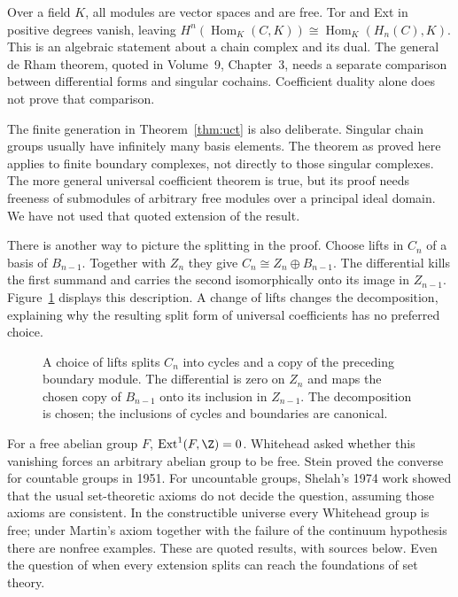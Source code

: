 Over a field $K$, all modules are vector spaces and are free. Tor and Ext in positive degrees vanish, leaving
$H^n(\operatorname{Hom}_K(C,K))\cong\operatorname{Hom}_K(H_n(C),K)$.
This is an algebraic statement about a chain complex and its dual. The general de Rham theorem, quoted in Volume~9, Chapter~3, needs a separate comparison between differential forms and singular cochains. Coefficient duality alone does not prove that comparison.

The finite generation in Theorem~\ref{thm:uct} is also deliberate. Singular chain groups usually have infinitely many basis elements. The theorem as proved here applies to finite boundary complexes, not directly to those singular complexes. The more general universal coefficient theorem is true, but its proof needs freeness of submodules of arbitrary free modules over a principal ideal domain. We have not used that quoted extension of the result.

There is another way to picture the splitting in the proof. Choose lifts in $C_n$ of a basis of $B_{n-1}$. Together with $Z_n$ they give $C_n\cong Z_n\oplus B_{n-1}$. The differential kills the first summand and carries the second isomorphically onto its image in $Z_{n-1}$. Figure~\ref{fig:v10new-ch07-cycles} displays this description. A change of lifts changes the decomposition, explaining why the resulting split form of universal coefficients has no preferred choice.

\begin{figure}[ht]
\centering
{}
\caption{A choice of lifts splits $C_n$ into cycles and a copy of the preceding boundary module. The differential is zero on $Z_n$ and maps the chosen copy of $B_{n-1}$ onto its inclusion in $Z_{n-1}$. The decomposition is chosen; the inclusions of cycles and boundaries are canonical.}
\label{fig:v10new-ch07-cycles}
\end{figure}

\begin{beauty}
For a free abelian group $F$, $\operatorname{Ext}^1(F,\Z)=0$. Whitehead asked whether this vanishing forces an arbitrary abelian group to be free. Stein proved the converse for countable groups in 1951. For uncountable groups, Shelah's 1974 work showed that the usual set-theoretic axioms do not decide the question, assuming those axioms are consistent. In the constructible universe every Whitehead group is free; under Martin's axiom together with the failure of the continuum hypothesis there are nonfree examples. These are quoted results, with sources below. Even the question of when every extension splits can reach the foundations of set theory.
\end{beauty}


